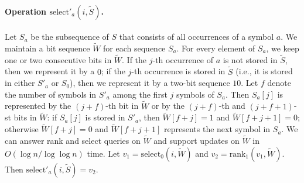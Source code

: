 \documentclass[11pt]{article}\usepackage{fullpage}
\def\idrm#1{\ensuremath{\mathrm{#1}}}
\newcommand{\tS}{{\tilde S}}
\newcommand{\tW}{{\tilde W}}
\newcommand{\ra}{\idrm{rank}}
\newcommand{\sel}{\idrm{select}}
\begin{document}
\paragraph{Operation $\sel'_a(i,\tS)$.}
Let $S_a$ be the subsequence of $S$ that consists of all occurrences of a symbol $a$. 
We maintain a bit sequence $\tW$ for each sequence $S_a$. 
For every element of $S_a$, we keep one or two consecutive bits 
in $\tW$. If the $j$-th occurrence of $a$ is not stored in $\tS$, then we represent it by a $0$; if the $j$-th occurrence 
is stored in $\tS$ (i.e., it is stored in either $S'_a$ or $S_0$), then we represent it by 
a two-bit sequence $10$. Let $f$ denote the number of symbols in $S'_a$ among the first $j$ symbols of $S_a$. Then $S_a[j]$ is represented by the $(j+f)$-th bit in $\tW$ or by the $(j+f)$-th and  $(j+f+1)$-st bits in $\tW$: if $S_a[j]$ is stored 
in $S'_a$, then $\tW[f+j]=1$ and $\tW[f+j+1]=0$; otherwise 
$\tW[f+j]=0$ and $\tW[f+j+1]$ represents the next symbol in $S_a$. We can answer rank and select queries on $\tW$ and support updates on $\tW$ in $O(\log n/\log \log n)$ time. 
Let $v_1=\sel_0(i,\tW)$ and $v_2=\ra_1(v_1,\tW)$. Then 
$\sel'_a(i,\tS)=v_2$.  
\end{document}
